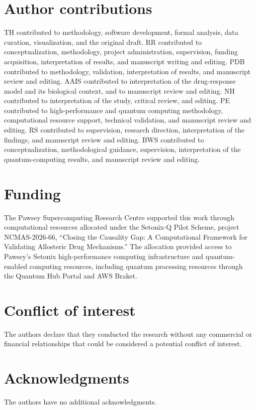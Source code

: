 \documentclass[utf8]{FrontiersinHarvard}
\begin{document}
\section*{Author contributions}
TH contributed to methodology, software development, formal analysis, data curation, visualization, and the original draft. RR contributed to conceptualization, methodology, project administration, supervision, funding acquisition, interpretation of results, and manuscript writing and editing. PDB contributed to methodology, validation, interpretation of results, and manuscript review and editing. AAIS contributed to interpretation of the drug-response model and its biological context, and to manuscript review and editing. NH contributed to interpretation of the study, critical review, and editing. PE contributed to high-performance and quantum computing methodology, computational resource support, technical validation, and manuscript review and editing. RS contributed to supervision, research direction, interpretation of the findings, and manuscript review and editing. BWS contributed to conceptualization, methodological guidance, supervision, interpretation of the quantum-computing results, and manuscript review and editing.



\section*{Funding}
The Pawsey Supercomputing Research Centre supported this work through computational resources allocated under the Setonix-Q Pilot Scheme, project NCMAS-2026-66, ``Closing the Causality Gap: A Computational Framework for Validating Allosteric Drug Mechanisms.'' The allocation provided access to Pawsey's Setonix high-performance computing infrastructure and quantum-enabled computing resources, including quantum processing resources through the Quantum Hub Portal and AWS Braket.


\section*{Conflict of interest}
The authors declare that they conducted the research without any commercial or financial relationships that could be considered a potential conflict of interest.


\section*{Acknowledgments}
The authors have no additional acknowledgments.
\end{document}
